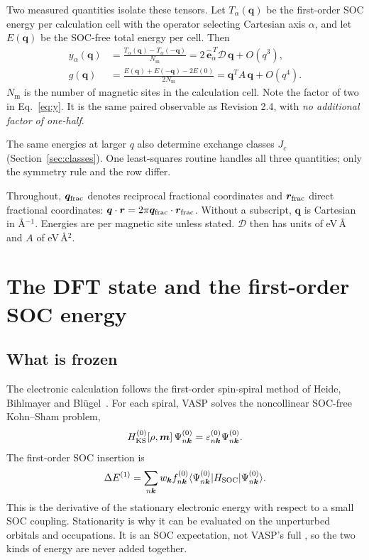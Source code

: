 \documentclass[11pt,a4paper]{article}
\numberwithin{equation}{section}
\newcommand{\vct}[1]{\bm{#1}}
\newcommand{\qh}{\vct q}
\newcommand{\kh}{\vct k}
\newcommand{\Nm}{N_{\mathrm m}}
\newcommand{\Dt}{\mathcal D}
\newcommand{\code}[1]{\texttt{\detokenize{#1}}}
\begin{document}
Two measured quantities isolate these tensors. Let $T_\alpha(\qh)$ be the
first-order SOC energy per calculation cell with the operator selecting
Cartesian axis $\alpha$, and let $E(\qh)$ be the SOC-free total energy per
cell. Then
\begin{align}
 y_\alpha(\qh)&=\frac{T_\alpha(\qh)-T_\alpha(-\qh)}{\Nm}
 =2\,\hat{\vct e}_\alpha^{\,T}\Dt\,\qh+O(q^3),\label{eq:y}\\
 g(\qh)&=\frac{E(\qh)+E(-\qh)-2E(0)}{2\Nm}
 =\qh^{T}A\,\qh+O(q^4).\label{eq:g}
\end{align}
$\Nm$ is the number of magnetic sites in the calculation cell. Note the factor
of two in Eq.~\eqref{eq:y}. It is the same paired observable as Revision 2.4,
with \emph{no additional factor of one-half}.

The same energies at larger $q$ also determine exchange classes $J_c$
(Section~\ref{sec:classes}). One least-squares routine handles all three
quantities; only the symmetry rule and the row differ.

Throughout, $\qh_{\rm frac}$ denotes reciprocal fractional coordinates and
$\vct r_{\rm frac}$ direct fractional coordinates:
$\qh\cdot\vct r=2\pi\qh_{\rm frac}\cdot\vct r_{\rm frac}$.
Without a subscript, $\qh$ is Cartesian in \AA$^{-1}$.
Energies are per magnetic site unless stated. $\Dt$ then has units of
eV\,\AA{} and $A$ of eV\,\AA$^2$.

\section{The DFT state and the first-order SOC energy}\label{sec:dft}

\subsection{What is frozen}

The electronic calculation follows the first-order spin-spiral method of
Heide, Bihlmayer and Bl\"ugel~\cite{heide}. For each spiral, VASP solves the
noncollinear SOC-free Kohn--Sham problem,
\begin{equation}\label{eq:ks}
 H^{(0)}_{\rm KS}[\rho,\vct m]\,\Psi^{(0)}_{n\kh}
 =\varepsilon^{(0)}_{n\kh}\Psi^{(0)}_{n\kh}.
\end{equation}
The first-order SOC insertion is
\begin{equation}\label{eq:firstorder}
 \Delta E^{(1)}=
 \sum_{n\kh}w_{\kh}f^{(0)}_{n\kh}
 \langle\Psi^{(0)}_{n\kh}|H_{\rm SOC}|\Psi^{(0)}_{n\kh}\rangle.
\end{equation}
This is the derivative of the stationary electronic energy with respect to a
small SOC coupling. Stationarity is why it can be evaluated on the unperturbed
orbitals and occupations. It is an SOC expectation, not VASP's full
\code{TOTEN}, so the two kinds of energy are never added together.
\end{document}
